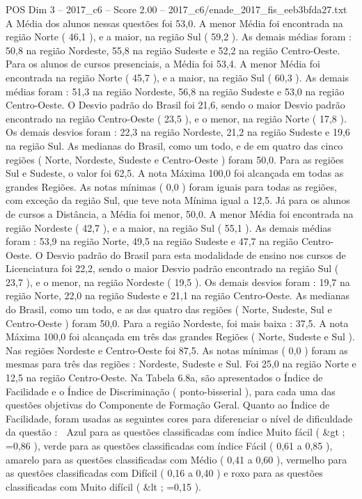 \begin{textsample}{POS Dim 3 – 2017\_c6 – Score 2.00 – 2017\_c6/enade\_2017\_fis\_eeb3bfda27.txt}
A Média dos alunos nessas questões foi 53,0.
A menor Média foi encontrada na região Norte ( 46,1 ), e a maior, na região Sul ( 59,2 ).
As demais médias foram : 50,8 na região Nordeste, 55,8 na região Sudeste e 52,2 na região Centro-Oeste.
Para os alunos de cursos presenciais, a Média foi 53,4.
A menor Média foi encontrada na região Norte ( 45,7 ), e a maior, na região Sul ( 60,3 ).
As demais médias foram : 51,3 na região Nordeste, 56,8 na região Sudeste e 53,0 na região Centro-Oeste.
O Desvio padrão do Brasil foi 21,6, sendo o maior Desvio padrão encontrado na região Centro-Oeste ( 23,5 ), e o menor, na região Norte ( 17,8 ).
Os demais desvios foram : 22,3 na região Nordeste, 21,2 na região Sudeste e 19,6 na região Sul.
As medianas do Brasil, como um todo, e de em quatro das cinco regiões ( Norte, Nordeste, Sudeste e Centro-Oeste ) foram 50,0.
Para as regiões Sul e Sudeste, o valor foi 62,5.
A nota Máxima 100,0 foi alcançada em todas as grandes Regiões.
As notas mínimas ( 0,0 ) foram iguais para todas as regiões, com exceção da região Sul, que teve nota Mínima igual a 12,5.
Já para os alunos de cursos a Distância, a Média foi menor, 50,0.
A menor Média foi encontrada na região Nordeste ( 42,7 ), e a maior, na região Sul ( 55,1 ).
As demais médias foram : 53,9 na região Norte, 49,5 na região Sudeste e 47,7 na região Centro-Oeste.
O Desvio padrão do Brasil para esta modalidade de ensino nos cursos de Licenciatura foi 22,2, sendo o maior Desvio padrão encontrado na região Sul ( 23,7 ), e o menor, na região Nordeste ( 19,5 ).
Os demais desvios foram : 19,7 na região Norte, 22,0 na região Sudeste e 21,1 na região Centro-Oeste.
As medianas do Brasil, como um todo, e as das quatro das regiões ( Norte, Sudeste, Sul e Centro-Oeste ) foram 50,0.
Para a região Nordeste, foi mais baixa : 37,5.
A nota Máxima 100,0 foi alcançada em três das grandes Regiões ( Norte, Sudeste e Sul ).
Nas regiões Nordeste e Centro-Oeste foi 87,5.
As notas mínimas ( 0,0 ) foram as mesmas para três das regiões : Nordeste, Sudeste e Sul.
Foi 25,0 na região Norte e 12,5 na região Centro-Oeste.
Na Tabela 6.8a, são apresentados o Índice de Facilidade e o Índice de Discriminação ( ponto-bisserial ), para cada uma das questões objetivas do Componente de Formação Geral.
Quanto ao Índice de Facilidade, foram usadas as seguintes cores para diferenciar o nível de dificuldade da questão :  Azul para as questões classificadas com índice Muito fácil ( \&gt ; =0,86 ), verde para as questões classificadas com índice Fácil ( 0,61 a 0,85 ), amarelo para as questões classificadas com Médio ( 0,41 a 0,60 ), vermelho para as questões classificadas com Difícil ( 0,16 a 0,40 ) e roxo para as questões classificadas com Muito difícil ( \&lt ; =0,15 ).

\end{textsample}
